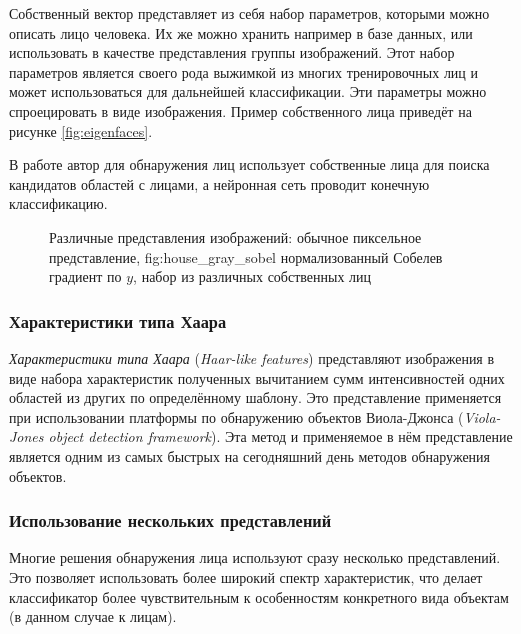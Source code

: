 \documentclass[12pt]{report}
\begin{document}
Собственный вектор представляет из себя набор параметров, которыми можно описать лицо человека. Их же можно хранить 
например в базе данных, или использовать в качестве представления группы изображений. Этот набор параметров является 
своего рода выжимкой из многих тренировочных лиц и может использоваться для дальнейшей классификации. Эти параметры 
можно спроецировать в виде изображения. Пример собственного лица приведёт на рисунке \ref{fig:eigenfaces}.

В работе \citep{tsai2006face} автор для обнаружения лиц использует собственные лица для поиска кандидатов областей с 
лицами, а нейронная сеть проводит конечную классификацию.

\begin{figure}[h]
	\centering
	\caption{Различные представления изображений:  обычное пиксельное представление, \subref
{fig:house_gray_sobel} нормализованный Собелев градиент по $y$,  набор из различных 
собственных лиц}
	\label{fig:representations}
\end{figure}

\subsubsection{Характеристики типа Хаара}
\emph{Характеристики типа Хаара} (\textit{Haar-like features}) представляют изображения в виде набора характеристик 
полученных вычитанием сумм интенсивностей одних областей из других по определённому шаблону. Это представление 
применяется при использовании платформы по обнаружению объектов Виола-Джонса (\textit{Viola-Jones object detection 
framework}). \citep{viola2001rapid}
Эта метод и применяемое в нём представление является одним из самых быстрых на сегодняшний день методов обнаружения 
объектов.

\subsubsection{Использование нескольких представлений}
Многие решения обнаружения лица используют сразу несколько представлений. Это позволяет использовать более широкий 
спектр характеристик, что делает классификатор более чувствительным к особенностям конкретного вида объектам (в 
данном случае к лицам).
\end{document}
